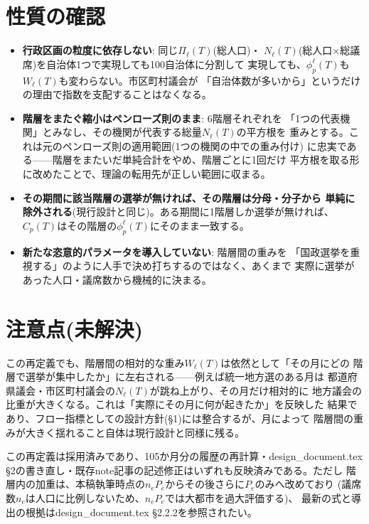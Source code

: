 \documentclass[a4paper,11pt]{ltjsarticle}
\begin{document}
\section{性質の確認}

\begin{itemize}
  \item \textbf{行政区画の粒度に依存しない}: 同じ$\Pi_\ell(T)$(総人口)・
    $N_\ell(T)$(総人口×総議席)を自治体1つで実現しても100自治体に分割して
    実現しても、$\phi_p^\ell(T)$も$W_\ell(T)$も変わらない。市区町村議会が
    「自治体数が多いから」というだけの理由で指数を支配することはなくなる。
  \item \textbf{階層をまたぐ縮小はペンローズ則のまま}: 6階層それぞれを
    「1つの代表機関」とみなし、その機関が代表する総量$N_\ell(T)$の平方根を
    重みとする。これは元のペンローズ則の適用範囲(1つの機関の中での重み付け)
    に忠実である——階層をまたいだ単純合計をやめ、階層ごとに1回だけ
    平方根を取る形に改めたことで、理論の転用先が正しい範囲に収まる。
  \item \textbf{その期間に該当階層の選挙が無ければ、その階層は分母・分子から
    単純に除外される}(現行設計と同じ)。ある期間に1階層しか選挙が無ければ、
    $C_p(T)$はその階層の$\phi_p^\ell(T)$にそのまま一致する。
  \item \textbf{新たな恣意的パラメータを導入していない}: 階層間の重みを
    「国政選挙を重視する」のように人手で決め打ちするのではなく、あくまで
    実際に選挙があった人口・議席数から機械的に決まる。
\end{itemize}

\section{注意点(未解決)}

この再定義でも、階層間の相対的な重み$W_\ell(T)$は依然として「その月にどの
階層で選挙が集中したか」に左右される——例えば統一地方選のある月は
都道府県議会・市区町村議会の$N_\ell(T)$が跳ね上がり、その月だけ相対的に
地方議会の比重が大きくなる。これは「実際にその月に何が起きたか」を反映した
結果であり、フロー指標としての設計方針(\S1)には整合するが、月によって
階層間の重みが大きく揺れること自体は現行設計と同様に残る。

この再定義は採用済みであり、105か月分の履歴の再計算・design\_document.tex
\S2の書き直し・既存note記事の記述修正はいずれも反映済みである。ただし
階層内の加重は、本稿執筆時点の$n_eP_e$からその後さらに$P_e$のみへ改めており
(議席数$n_e$は人口に比例しないため、$n_eP_e$では大都市を過大評価する)、
最新の式と導出の根拠はdesign\_document.tex \S2.2.2を参照されたい。
\end{document}
